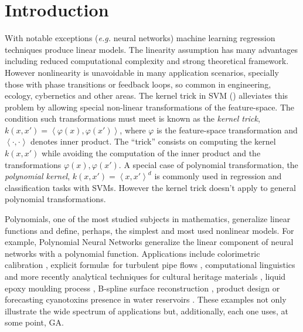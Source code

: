 \documentclass[review,preprint]{elsarticle}
\newcommand{\at}[1]{\ensuremath{\!\left(#1\right)}}
\newcommand{\revised}[2]{}
\begin{document}
\revised{What is the reference for the GA encoding used?}{It is ours. We stated this contribution more explicitly.}

\revised{The penalty term introduces is the main contribution of this work, this should be clearly stated in the text. It is basically a complexity based penalty which is really not so novel, there are even several cases in literature of penalty based GA functions.  Please dig up further in the state of the art to back up better your claim of novelty.}{We included references to previous regularization in GA and better outlined the role and originality of our contribution.}

\revised{In some box plots only ten simulations are performed, in others 25.  These numbers are too low.}{The number of samples was increased.}
%
%
\linenumbers

\section{Introduction}
With notable exceptions (\emph{e.g.} neural networks) machine learning regression techniques produce linear models. The linearity assumption has many advantages including reduced computational complexity and strong the\-o\-re\-ti\-cal framework. However nonlinearity is unavoidable in many application scenarios, specially those with phase transitions or feedback loops, so common in engineering, ecology, cybernetics and other areas. The kernel trick in \ac{SVM} (\cite{scholkopf1997kernel, liang2012eigen, Bao:2013aa}) alleviates this problem by allowing special non-linear transformations of the feature-space. The condition such transformations must meet is known as the \emph{kernel trick}, $k\at{x,x'} = \left< \varphi\at{x}, \varphi\at{x'} \right>$, where $\varphi$ is the feature-space transformation and $\left<\cdot,\cdot\right>$ denotes inner product. The ``trick'' consists on computing the kernel $k\at{x,x'}$ while avoiding the computation of the inner product and the transformations $\varphi\at{x}, \varphi\at{x'}$. A special case of polynomial transformation, the \emph{polynomial kernel}, $k\at{x,x'} = \left<x,x'\right>^d$ is commonly used in regression and classification tasks with \acp{SVM}. However the kernel trick doesn't apply to general polynomial transformations.

Polynomials, one of the most studied subjects in mathematics, generalize li\-ne\-ar functions and define, perhaps, the simplest and most used nonlinear models. For example, Polynomial Neural Networks \cite{dehuri2011condensed} generalize the linear component of neural networks with a polynomial function. Applications include colorimetric calibration \citep{Mendes:2005aa}, explicit formul\ae\ for turbulent pipe flows
 \citep{Davidson:1999aa}, computational linguistics \citep{Sanchez:2009aa} and more recently analytical techniques for cultural heritage materials \citep{Csefalvayova:2010aa}, liquid epoxy moulding process \citep{Chan:2011aa}, B-spline surface reconstruction \citep{Galvez:2012aa}, product design \citep{Chan:2012aa} or forecasting cyanotoxins presence in water reservoirs \citep{Garcia-Nieto:2013aa}. These examples not only illustrate the wide spectrum of applications but, additionally, each one uses, at some point, \ac{GA}.
\end{document}
